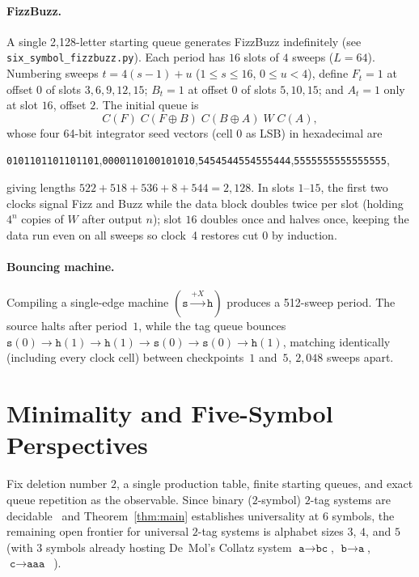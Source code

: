 \documentclass{article}
\theoremstyle{definition}
\theoremstyle{remark}
\newcommand{\ttw}[1]{\texttt{#1}}
\begin{document}
\paragraph{FizzBuzz.}
A single 2,128-letter starting queue generates FizzBuzz indefinitely (see \ttw{six\_symbol\_\allowbreak fizzbuzz.py}).
Each period has $16$ slots of $4$ sweeps ($L = 64$).
Numbering sweeps $t = 4(s-1) + u$ ($1 \le s \le 16$, $0 \le u < 4$), define $F_t = 1$ at offset $0$ of slots $3,6,9,12,15$; $B_t = 1$ at offset $0$ of slots $5,10,15$; and $A_t = 1$ only at slot $16$, offset $2$.
The initial queue is
\[
C(F)\; C(F \oplus B)\; C(B \oplus A)\; W\; C(A),
\]
whose four 64-bit integrator seed vectors (cell $0$ as LSB) in hexadecimal are
\begin{center}
\ttw{0101101101101101},\quad \ttw{0000110100101010},\quad \ttw{5454544554555444},\quad \ttw{5555555555555555},
\end{center}
giving lengths $522 + 518 + 536 + 8 + 544 = 2{,}128$.
In slots $1$--$15$, the first two clocks signal Fizz and Buzz while the data block doubles twice per slot (holding $4^n$ copies of $W$ after output $n$); slot $16$ doubles once and halves once, keeping the data run even on all sweeps so clock~4 restores cut $0$ by induction.

\paragraph{Bouncing machine.}
Compiling a single-edge machine $(\ttw{s} \xrightarrow{+X} \ttw{h})$ produces a 512-sweep period.
The source halts after period~$1$, while the tag queue bounces $\ttw{s}(0) \to \ttw{h}(1) \to \ttw{h}(1) \to \ttw{s}(0) \to \ttw{s}(0) \to \ttw{h}(1)$, matching identically (including every clock cell) between checkpoints~$1$ and~$5$, $2{,}048$ sweeps apart.

\section{Minimality and Five-Symbol Perspectives}

Fix deletion number $2$, a single production table, finite starting queues, and exact queue repetition as the observable.
Since binary ($2$-symbol) $2$-tag systems are decidable~\cite{DeMol2010} and Theorem~\ref{thm:main} establishes universality at $6$ symbols, the remaining open frontier for universal $2$-tag systems is alphabet sizes $3$, $4$, and $5$ (with $3$ symbols already hosting De~Mol's Collatz system $\ttw{a} \to \ttw{bc}$, $\ttw{b} \to \ttw{a}$, $\ttw{c} \to \ttw{aaa}$~\cite{DeMol2008}).
\end{document}
